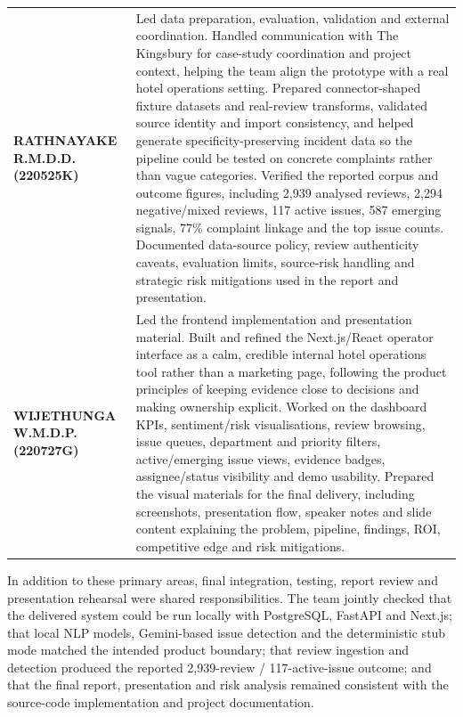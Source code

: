 \documentclass[11pt,a4paper]{article}
\begin{document}
\begin{longtable}{>{\bfseries}p{4.0cm}p{10.8cm}}
RATHNAYAKE R.M.D.D. (220525K) &
Led data preparation, evaluation, validation and external coordination. Handled communication with The
Kingsbury for case-study coordination and project context, helping the team align the prototype with a
real hotel operations setting. Prepared connector-shaped fixture datasets and real-review transforms,
validated source identity and import consistency, and helped generate specificity-preserving incident
data so the pipeline could be tested on concrete complaints rather than vague categories. Verified the
reported corpus and outcome figures, including 2{,}939 analysed reviews, 2{,}294 negative/mixed
reviews, 117 active issues, 587 emerging signals, 77\% complaint linkage and the top issue counts.
Documented data-source policy, review authenticity caveats, evaluation limits, source-risk handling
and strategic risk mitigations used in the report and presentation. \\

WIJETHUNGA W.M.D.P. (220727G) &
Led the frontend implementation and presentation material. Built and refined the Next.js/React
operator interface as a calm, credible internal hotel operations tool rather than a marketing page,
following the product principles of keeping evidence close to decisions and making ownership explicit.
Worked on the dashboard KPIs, sentiment/risk visualisations, review browsing, issue queues, department
and priority filters, active/emerging issue views, evidence badges, assignee/status visibility and
demo usability. Prepared the visual materials for the final delivery, including screenshots,
presentation flow, speaker notes and slide content explaining the problem, pipeline, findings, ROI,
competitive edge and risk mitigations. \\
\end{longtable}

\noindent
In addition to these primary areas, final integration, testing, report review and presentation
rehearsal were shared responsibilities. The team jointly checked that the delivered system could be
run locally with PostgreSQL, FastAPI and Next.js; that local NLP models, Gemini-based issue detection
and the deterministic stub mode matched the intended product boundary; that review ingestion and
detection produced the reported 2{,}939-review / 117-active-issue outcome; and that the final report,
presentation and risk analysis remained consistent with the source-code implementation and project
documentation.


\end{document}
